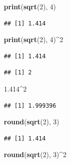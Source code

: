 \documentclass[]{book}
\newenvironment{Shaded}{\begin{snugshade}}{\end{snugshade}}
\newcommand{\DecValTok}[1]{\textcolor[rgb]{0.00,0.00,0.81}{#1}}
\newcommand{\FloatTok}[1]{\textcolor[rgb]{0.00,0.00,0.81}{#1}}
\newcommand{\KeywordTok}[1]{\textcolor[rgb]{0.13,0.29,0.53}{\textbf{#1}}}
\newcommand{\NormalTok}[1]{#1}
\newcommand{\OperatorTok}[1]{\textcolor[rgb]{0.81,0.36,0.00}{\textbf{#1}}}
\theoremstyle{definition}
\theoremstyle{definition}
\theoremstyle{definition}
\theoremstyle{remark}
\begin{document}
\begin{Shaded}
\begin{Highlighting}[]
\KeywordTok{print}\NormalTok{(}\KeywordTok{sqrt}\NormalTok{(}\DecValTok{2}\NormalTok{), }\DecValTok{4}\NormalTok{)}
\end{Highlighting}
\end{Shaded}

\begin{verbatim}
## [1] 1.414
\end{verbatim}

\begin{Shaded}
\begin{Highlighting}[]
\KeywordTok{print}\NormalTok{(}\KeywordTok{sqrt}\NormalTok{(}\DecValTok{2}\NormalTok{), }\DecValTok{4}\NormalTok{)}\OperatorTok{^}\DecValTok{2}
\end{Highlighting}
\end{Shaded}

\begin{verbatim}
## [1] 1.414
\end{verbatim}

\begin{verbatim}
## [1] 2
\end{verbatim}

\begin{Shaded}
\begin{Highlighting}[]
\FloatTok{1.414}\OperatorTok{^}\DecValTok{2}
\end{Highlighting}
\end{Shaded}

\begin{verbatim}
## [1] 1.999396
\end{verbatim}

\begin{Shaded}
\begin{Highlighting}[]
\KeywordTok{round}\NormalTok{(}\KeywordTok{sqrt}\NormalTok{(}\DecValTok{2}\NormalTok{), }\DecValTok{3}\NormalTok{)}
\end{Highlighting}
\end{Shaded}

\begin{verbatim}
## [1] 1.414
\end{verbatim}

\begin{Shaded}
\begin{Highlighting}[]
\KeywordTok{round}\NormalTok{(}\KeywordTok{sqrt}\NormalTok{(}\DecValTok{2}\NormalTok{), }\DecValTok{3}\NormalTok{)}\OperatorTok{^}\DecValTok{2}
\end{Highlighting}
\end{Shaded}
\end{document}
